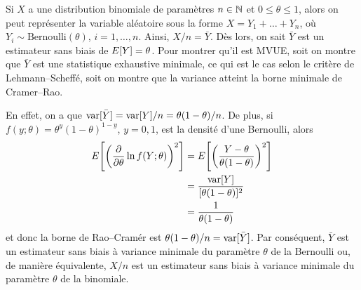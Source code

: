 \begin{solution}{3.19}
    Si $X$ a une distribution binomiale de paramètres $n \in \mathbb{N}$ et $0
    \leq \theta \leq 1$, alors on peut représenter la variable
    aléatoire sous la forme $X = Y_1 + \dots + Y_n$, où $Y_i \sim
    \text{Bernoulli}(\theta)$, $i = 1, \dots, n$. Ainsi, $X/n =
    \bar{Y}$. Dès lors, on sait $\bar{Y}$ est un estimateur sans biais
    de $E [ Y ] = \theta$. Pour montrer qu'il est MVUE, soit on montre que $\bar{Y}$
    est une statistique exhaustive minimale, ce qui est le cas selon le critère de Lehmann--Scheffé, soit on montre que la variance atteint la borne minimale de Cramer--Rao.

    En effet, on a que $\mathrm{var} [ \bar{Y} ] = \mathrm{var} [ Y ]/n = \theta(1
    - \theta)/n$. De plus, si $f(y; \theta) = \theta^y (1 - \theta)^{1
      - y}$, $y = 0, 1$, est la densité d'une Bernoulli, alors
    \begin{align*}
      E\! \left[ \left( \frac{\partial}{\partial \theta}
          \ln f(Y; \theta) \right)^2 \right]
      &= E\! \left[ \left( \frac{Y - \theta}{\theta (1 - \theta)}
        \right)^2 \right] \\
      &= \frac{\mathrm{var} [ Y ]}{[\theta (1 - \theta)]^2} \\
      &= \frac{1}{\theta (1 - \theta)}
    \end{align*}
    et donc la borne de Rao--Cramér est $\theta (1 - \theta)/n =
    \mathrm{var} [ \bar{Y} ]$. Par conséquent, $\bar{Y}$ est un estimateur sans
    biais à variance minimale du paramètre $\theta$ de la Bernoulli
    ou, de manière équivalente, $X/n$ est un estimateur sans biais à
    variance minimale du paramètre $\theta$ de la binomiale.
  
\end{solution}
